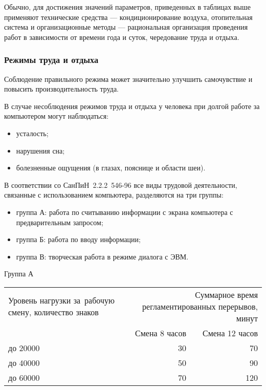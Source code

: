 Обычно, для достижения значений параметров, приведенных в таблицах 
выше применяют технические средства --- кондиционирование
воздуха, отопительная система и организационные методы --- рациональная
организация проведения работ в зависимости от времени года и суток,
чередование труда и отдыха.

\subsubsection{Режимы труда и отдыха}

Соблюдение правильного режима может значительно
улучшить самочувствие и повысить производительность труда.

В случае несоблюдения режимов труда и отдыха у человека 
при долгой работе за компьютером могут наблюдаться:

\begin{itemize}
	\item	усталость;
	\item	нарушения сна;
	\item	болезненные ощущения 
		(в глазах, пояснице и области шеи).
\end{itemize}

В соответствии со \mbox{СанПиН 2.2.2 546-96} все виды трудовой деятельности, 
связанные с использованием компьютера, разделяются на три группы:

\begin{itemize}
	\item  группа А: работа по считыванию информации 
		с экрана компьютера с предварительным запросом;
	\item  группа Б: работа по вводу информации;
	\item  группа В: творческая работа в режиме диалога с ЭВМ. 
\end{itemize}

\begin{dtable}{Группа А}
	\begin{tabular}{|m{4cm}|r|r|}
		\hline	Уровень нагрузки за~рабочую смену, количест­во знаков
			& \multicolumn{2}{m{7cm}|}{Суммарное время регламентированных перерывов, минут } \\
		\cline{2-3}   															&	Смена 8 часов 	&	Смена 12 часов  \\
		\hline	до 20000
																					& 	30 		  &		70		    \\
		\hline	до 40000
																					& 	50 		  &		90		    \\
		\hline	до 60000 
																					& 	70 		  &		120		    \\
		\hline 
	\end{tabular} 
\end{dtable}


